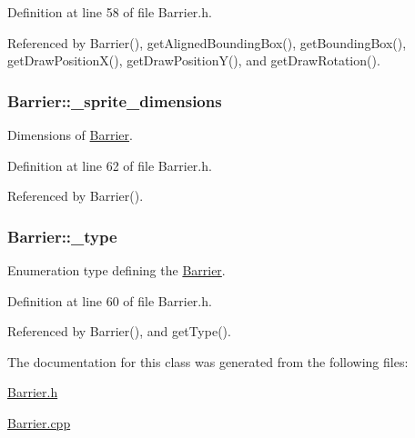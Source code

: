 Definition at line 58 of file Barrier.\-h.



Referenced by Barrier(), get\-Aligned\-Bounding\-Box(), get\-Bounding\-Box(), get\-Draw\-Position\-X(), get\-Draw\-Position\-Y(), and get\-Draw\-Rotation().

\hypertarget{classBarrier_aec1d9dbf82de85ee800808c16c587ab3}{
\subsubsection[{\-\_\-sprite\-\_\-dimensions}]{ Barrier\-::\-\_\-sprite\-\_\-dimensions\hspace{0.3cm}{\ttfamily [private]}}}\label{classBarrier_aec1d9dbf82de85ee800808c16c587ab3}


Dimensions of \hyperlink{classBarrier}{Barrier}. 



Definition at line 62 of file Barrier.\-h.



Referenced by Barrier().

\hypertarget{classBarrier_ab4bfa33b658ab34e4053494c06e9d9a1}{
\subsubsection[{\-\_\-type}]{ Barrier\-::\-\_\-type\hspace{0.3cm}{\ttfamily [private]}}}\label{classBarrier_ab4bfa33b658ab34e4053494c06e9d9a1}


Enumeration type defining the \hyperlink{classBarrier}{Barrier}. 



Definition at line 60 of file Barrier.\-h.



Referenced by Barrier(), and get\-Type().



The documentation for this class was generated from the following files\-:\begin{DoxyCompactItemize}
\item 
\hyperlink{Barrier_8h}{Barrier.\-h}\item 
\hyperlink{Barrier_8cpp}{Barrier.\-cpp}\end{DoxyCompactItemize}
